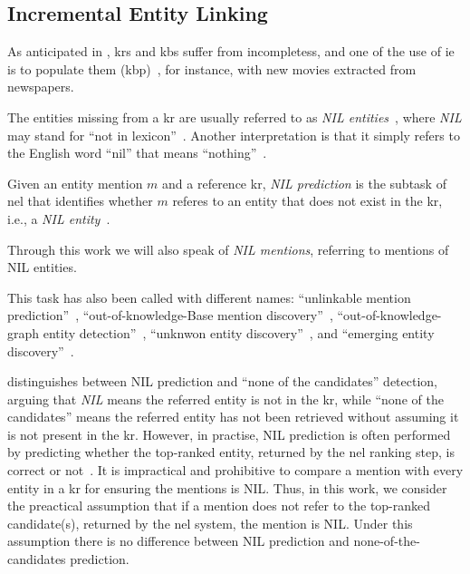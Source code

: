 \subsection{Incremental Entity Linking}
\label{sec:incrementalel}

As anticipated in , \acp{kr} and \acp{kb} suffer from incompletess, and one of the use of \ac{ie} is to populate them (\acf{kbp})~\cite{entityorientedsearch2018balog}, for instance, with new movies extracted from newspapers.

The entities missing from a \ac{kr} are usually referred to as \emph{NIL entities}~\cite{entityorientedsearch2018balog}, where \emph{NIL} may stand for ``not in lexicon''~\cite{ILIEVSKI2020100565}. Another interpretation is that it simply refers to the English word ``nil'' that means ``nothing''~\cite{cambridge_nil}.

\begin{definition}
    Given an entity mention $m$ and a reference \ac{kr}, \emph{NIL prediction} is the subtask of \acl{nel} that identifies whether $m$ referes to an entity that does not exist in the \ac{kr}, i.e., a \emph{NIL entity}~\cite{entity_linking_with_kb_2015}. 
\end{definition}
Through this work we will also speak of \emph{NIL mentions}, referring to mentions of NIL entities. 

This task has also been called with different names: ``unlinkable mention prediction''~\cite{entity_linking_with_kb_2015}, ``out-of-knowledge-Base mention discovery''~\cite{dong_reveal_the_unknown_2023}, ``out-of-knowledge-graph entity detection''~\cite{moller2024entity}, ``unknwon entity discovery''~\cite{kassner-etal-2022-edin}, and ``emerging entity discovery''~\cite{hoffart_discovering_emergin_entities_2014}.

\textcite{zhou-etal-2024-gendecider} distinguishes between NIL prediction and ``none of the candidates'' detection, arguing that \emph{NIL} means the referred entity is not in the \ac{kr}, while ``none of the candidates'' means the referred entity has not been retrieved without assuming it is not present in the \ac{kr}. However, in practise, NIL prediction is often performed by predicting whether the top-ranked entity, returned by the \ac{nel} ranking step, is correct or not~\cite{entity_linking_with_kb_2015}. It is impractical and prohibitive to compare a mention with every entity in a \ac{kr} for ensuring the mentions is NIL. Thus, in this work, we consider the preactical assumption that if a mention does not refer to the top-ranked candidate(s), returned by the \ac{nel} system, the mention is NIL. Under this assumption there is no difference between NIL prediction and none-of-the-candidates prediction.

